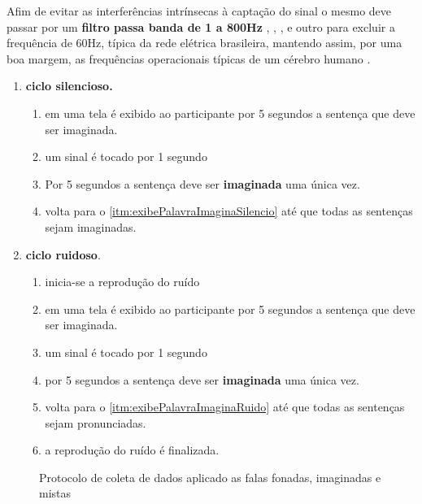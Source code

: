   			    \par Afim de evitar as interferências intrínsecas à captação do sinal o mesmo deve passar por um \textbf{filtro passa banda de 1 a 800Hz} \cite{JALALYBIDGOLY2020101788}, \cite{Moffett2017}, \cite{hfreOscEngel}, e outro para excluir a frequência de 60Hz, típica da rede elétrica brasileira, mantendo assim, por uma boa margem, as frequências operacionais típicas de um cérebro humano .
		    	
			    \begin{enumerate}
			    	\item \textbf{ciclo silencioso.}
			    	\begin{enumerate}
			    		\item em uma tela é exibido ao participante por 5 segundos a sentença que deve ser imaginada.\label{itm:exibePalavraImaginaSilencio}
			    		\item um sinal é tocado por 1 segundo
			    		\item Por 5 segundos a sentença deve ser \textbf{imaginada} uma única vez.
			    		\item volta para o \autoref{itm:exibePalavraImaginaSilencio} até que todas as sentenças sejam imaginadas.
			    	\end{enumerate}
			    	\item \textbf{ciclo ruidoso}.
			    	\begin{enumerate}
			    		\item inicia-se a reprodução do ruído
			    		\item em uma tela é exibido ao participante por 5 segundos a sentença que deve ser imaginada.\label{itm:exibePalavraImaginaRuido}
			    		\item um sinal é tocado por 1 segundo
			    		\item por 5 segundos a sentença deve ser \textbf{imaginada} uma única vez.
			    		\item volta para o \autoref{itm:exibePalavraImaginaRuido} até que todas as sentenças sejam pronunciadas.
			    		\item a reprodução do ruído é finalizada.
			    	\end{enumerate}
			    \end{enumerate}
			    
				\begin{figure}[H]
					\centering
					\caption[Protocolo de coleta de dados]{Protocolo de coleta de dados aplicado as falas fonadas, imaginadas e mistas}
				\end{figure}
				
